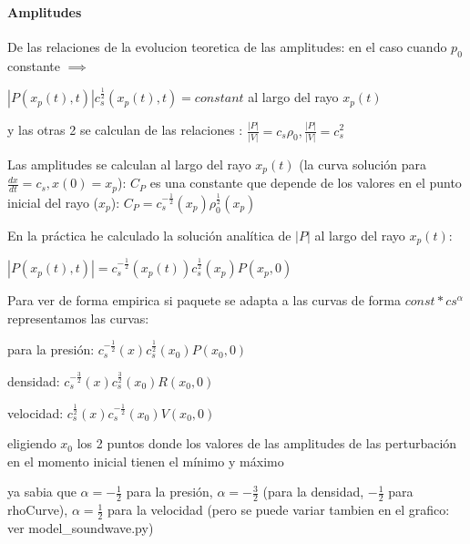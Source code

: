\documentclass{article}
\begin{document}
\begin{description}
\end{description}

\paragraph{Amplitudes}
\begin{description}
\item De las relaciones de  la evolucion teoretica de las amplitudes: en el caso cuando $ p_0$ constante $\implies$  
\item $|P(x_p(t),t)| c_s^{\frac{1}{2}}(x_p(t),t) = constant $ al largo del rayo $x_p(t)$
\item y las otras 2 se calculan de las relaciones : $\frac{|P|}{|V|} = c_s \rho_0 , \frac{|P|}{|V|} = c_s^2$
\item Las amplitudes se calculan al largo del rayo  $x_p(t)$ (la curva solución para  $\frac{dx}{dt} = c_s, x(0) = x_p$): $C_P$ es una constante que depende de los valores en el punto inicial del rayo ($x_p$): $C_P = c_s^{-\frac{1}{2}}(x_p) \rho_0^{\frac{1}{2}}(x_p)$

\item En la práctica he calculado la solución analítica de $|P|$ al largo del rayo $x_p(t)$:
\item $|P(x_p(t),t)| = c_s^{-\frac{1}{2}}(x_p(t)) c_s^{\frac{1}{2}}(x_p) P(x_p,0)  $
\item Para ver de forma empirica si paquete se adapta  a las curvas de forma  $const * cs^{\alpha} $representamos las curvas:
\item para la presión: $ c_s^{-\frac{1}{2}}(x) c_s^{\frac{1}{2}}(x_0) P(x_0,0) $
\item densidad: $ c_s^{-\frac{3}{2}}(x) c_s^{\frac{3}{2}}(x_0) R(x_0,0)  $ 
\item velocidad: $ c_s^{\frac{1}{2}}(x) c_s^{-\frac{1}{2}}(x_0) V(x_0,0)  $ 
\item eligiendo $x_0$ los 2 puntos donde  los valores de las amplitudes de las perturbación en el momento inicial tienen el mínimo y máximo 
\item ya sabia que $\alpha = -\frac{1}{2}$ para la presión, $\alpha = -\frac{3}{2}$ (para la densidad, $-\frac{1}{2}$ para rhoCurve), $\alpha = \frac{1}{2}$ para la velocidad (pero se puede variar tambien en el grafico: ver model\_soundwave.py)
\end{description}
\end{document}
